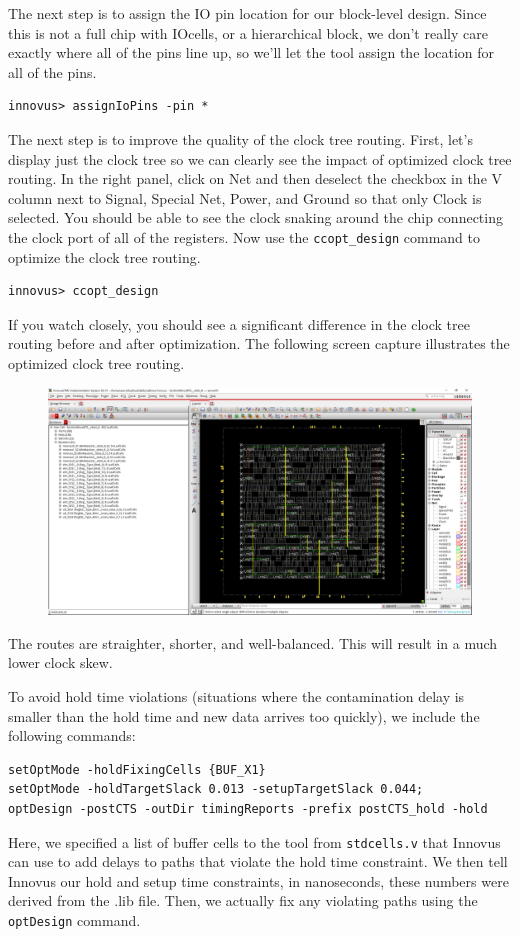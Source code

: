 \documentclass[a4paper,12pt,twoside]{article}
\begin{document}
The next step is to assign the IO pin location for our block-level design. Since this is not a full chip with IOcells, or a hierarchical block, we don’t really care exactly where all of the pins line up, so we’ll let the tool assign the location for all of the pins.
\begin{verbatim}
innovus> assignIoPins -pin *
\end{verbatim}
The next step is to improve the quality of the clock tree routing. First, let’s display just the clock tree so we can clearly see the impact of optimized clock tree routing. In the right panel, click on Net and then deselect the checkbox in the V column next to Signal, Special Net, Power, and Ground so that only Clock is selected. You should be able to see the clock snaking around the chip connecting the clock port of all of the registers. Now use the \texttt{ccopt\_design} command to optimize the clock tree routing.
\begin{verbatim}
innovus> ccopt_design
\end{verbatim}
If you watch closely, you should see a significant difference in the clock tree routing before and after optimization. The following screen capture illustrates the optimized clock tree routing.
\begin{figure}[H]
    \centering
    \includegraphics[width=\textwidth]{images/16.png}
\end{figure}
The routes are straighter, shorter, and well-balanced. This will result in a much lower clock skew.

To avoid hold time violations (situations where the contamination delay is smaller than the hold time and new data arrives too quickly), we include the following commands:
\begin{verbatim}
setOptMode -holdFixingCells {BUF_X1}
setOptMode -holdTargetSlack 0.013 -setupTargetSlack 0.044;
optDesign -postCTS -outDir timingReports -prefix postCTS_hold -hold
\end{verbatim}
Here, we specified a list of buffer cells to the tool from \texttt{stdcells.v} that Innovus can use to add delays to paths that violate the hold time constraint. We then tell Innovus our hold and setup time constraints, in nanoseconds, these numbers were derived from the .lib file. Then, we actually fix any violating paths using the \texttt{optDesign} command.
\end{document}
